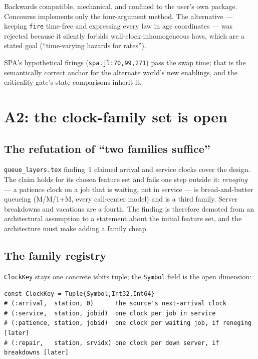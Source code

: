 \documentclass[11pt]{article}
\newcommand{\code}[1]{\texttt{#1}}
\begin{document}
Backwards compatible, mechanical, and confined to the user's own package.
Concourse implements only the four-argument method. The alternative ---
keeping \code{fire} time-free and expressing every law in age coordinates ---
was rejected because it silently forbids wall-clock-inhomogeneous laws,
which are a stated goal (``time-varying hazards for rates'').

SPA's hypothetical firings (\code{spa.jl:70,99,271}) pass the swap time;
that is the semantically correct anchor for the alternate world's new
enablings, and the criticality gate's state comparisons inherit it.

\section{A2: the clock-family set is open}
\label{sec:a2}

\subsection{The refutation of ``two families suffice''}

\code{queue\_layers.tex} finding~1 claimed arrival and service clocks cover
the design. The claim holds for its chosen feature set and fails one step
outside it: \emph{reneging} --- a patience clock on a job that is waiting,
not in service --- is bread-and-butter queueing (M/M/1+M, every call-center
model) and is a third family. Server breakdowns and vacations are a fourth.
The finding is therefore demoted from an architectural assumption to a
statement about the initial feature set, and the architecture must make
adding a family cheap.

\subsection{The family registry}

\code{ClockKey} stays one concrete isbits tuple; the \code{Symbol} field is
the open dimension:

\begin{lstlisting}
const ClockKey = Tuple{Symbol,Int32,Int64}
# (:arrival,  station, 0)      the source's next-arrival clock
# (:service,  station, jobid)  one clock per job in service
# (:patience, station, jobid)  one clock per waiting job, if reneging   [later]
# (:repair,   station, srvidx) one clock per down server, if breakdowns [later]
\end{lstlisting}
\end{document}
